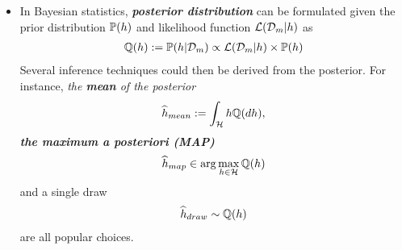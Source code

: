 \documentclass[11pt]{article}
\begin{document}
\begin{itemize}
\item \begin{remark}
In Bayesian statistics, \emph{\textbf{posterior distribution}} can be formulated given the prior distribution ${\mathbb P}(h)$ and likelihood function ${\mathcal L}({\mathcal D}_m | h)$ as
\begin{align}
{\mathbb Q}(h) := {\mathbb P}(h | {\mathcal D}_m) \propto {\mathcal L}({\mathcal D}_m | h) \times {\mathbb P}(h) \label{eqn: posterior_dist}
\end{align} Several inference techniques could then be derived from the posterior. For instance, \emph{the \textbf{mean} of the posterior}
\begin{align*}
\widehat{h}_{mean} := \int_{{\mathcal H}} h  {\mathbb Q}(dh),
\end{align*} \emph{\textbf{the maximum a posteriori (MAP)}}
\begin{align*}
\widehat{h}_{map} \in \arg\max_{h\in {\mathcal H}}{\mathbb Q}(h)
\end{align*} and a single draw
\begin{align*}
\widehat{h}_{draw} \sim {\mathbb Q}(h)
\end{align*} are all popular choices.
\end{remark}
\end{itemize}
\end{document}
